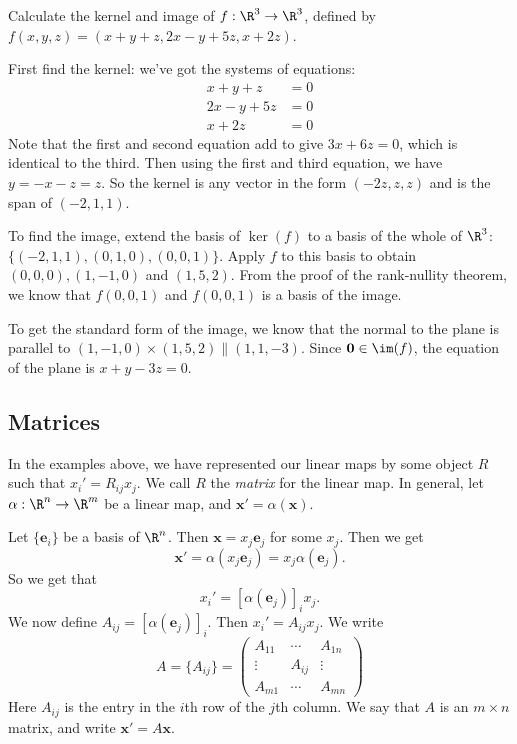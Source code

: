 \documentclass[a4paper]{article}
\begin{document}
\begin{eg}
  Calculate the kernel and image of $f:\R^3\to \R^3$, defined by $f(x, y, z) = (x + y + z, 2x - y+ 5z, x + 2z)$.

  First find the kernel: we've got the systems of equations:
  \begin{align*}
    x + y + z &= 0\\
    2x - y + 5z &= 0\\
    x + 2z &= 0
  \end{align*}
  Note that the first and second equation add to give $3x + 6z = 0$, which is identical to the third. Then using the first and third equation, we have $y = -x - z = z$. So the kernel is any vector in the form $(-2z, z, z)$ and is the span of $(-2, 1, 1)$.

  To find the image, extend the basis of $\ker(f)$ to a basis of the whole of $\R^3$: $\{(-2, 1, 1), (0, 1, 0), (0, 0, 1)\}$. Apply $f$ to this basis to obtain $(0, 0, 0), (1, -1, 0)$ and $(1, 5, 2)$. From the proof of the rank-nullity theorem, we know that $f(0, 0, 1)$ and $f(0, 0, 1)$ is a basis of the image.

  To get the standard form of the image, we know that the normal to the plane is parallel to $(1, -1, 0)\times (1, 5, 2) \parallel (1, 1, -3)$. Since $\mathbf{0}\in \im (f)$, the equation of the plane is $x + y - 3z = 0$.
\end{eg}

\subsection{Matrices}
In the examples above, we have represented our linear maps by some object $R$ such that $x_i' = R_{ij}x_j$. We call $R$ the \emph{matrix} for the linear map. In general, let $\alpha: \R^n \to \R^m$ be a linear map, and $\mathbf{x}' = \alpha(\mathbf{x})$.

Let $\{\mathbf{e}_i\}$ be a basis of $\R^n$. Then $\mathbf{x} = x_j \mathbf{e}_j$ for some $x_j$. Then we get
\[
  \mathbf{x}' = \alpha(x_j \mathbf{e}_j) = x_j \alpha(\mathbf{e}_j).
\]
So we get that
\[
  x_i' = [\alpha(\mathbf{e}_j)]_i x_j.
\]
We now define $A_{ij} = [\alpha(\mathbf{e}_j)]_i$. Then $x_i' = A_{ij}x_j$. We write
\[
  A = \{A_{ij}\} =
  \begin{pmatrix}
    A_{11} & \cdots & A_{1n}\\
    \vdots & A_{ij} & \vdots\\
    A_{m1} & \cdots & A_{mn}
  \end{pmatrix}
\]
Here $A_{ij}$ is the entry in the $i$th row of the $j$th column. We say that $A$ is an $m\times n$ matrix, and write $\mathbf{x}' = A\mathbf{x}$.
\end{document}
